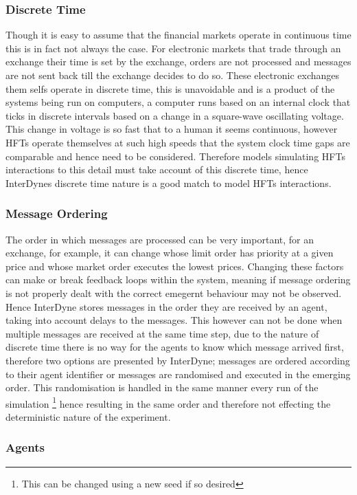 \documentclass{article}
\begin{document}
\subsubsection{Discrete Time}
Though it is easy to assume that the financial markets operate in continuous time this is in fact not always the case. For electronic markets that trade through an exchange their time is set by the exchange, orders are not processed and messages are not sent back till the exchange decides to do so. These electronic exchanges them selfs operate in discrete time, this is unavoidable and is a product of the systems being run on computers, a computer runs based on an internal clock that ticks in discrete intervals based on a change in a square-wave oscillating voltage. This change in voltage is so fast that to a human it seems continuous, however HFTs operate themselves at such high speeds that the system clock time gaps are comparable and hence need to be considered. Therefore models simulating HFTs interactions to this detail must take account of this discrete time, hence InterDynes discrete time nature is a good match to model HFTs interactions.     
     

\subsubsection{Message Ordering}
The order in which messages are processed can be very important, for an exchange, for example, it can change whose limit order has priority at a given price and whose market order executes the lowest prices. Changing these factors can make or break feedback loops within the system, meaning if message ordering is not properly dealt with the correct emegernt behaviour may not be observed. Hence InterDyne stores messages in the order they are received by an agent, taking into account delays to the messages. This however can not be done when multiple messages are received at the same time step, due to the nature of discrete time there is no way for the agents to know which message arrived first, therefore two options are presented by InterDyne; messages are ordered according to their agent identifier %
or messages are randomised and executed in the  emerging order. This randomisation is handled in the same manner every run of the simulation \footnote{This can be changed using a new seed if so desired} hence resulting in the same order and therefore not effecting the deterministic nature of the experiment.  


\subsubsection{Agents}
\end{document}
